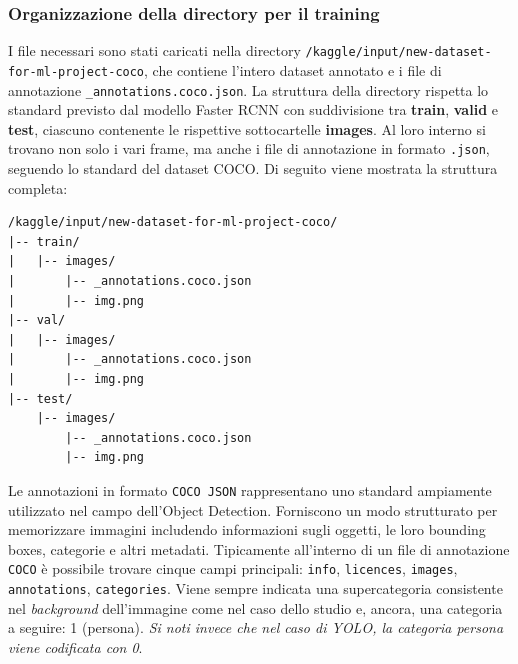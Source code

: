 \documentclass[12pt]{article}
\begin{document}
\subsubsection{Organizzazione della directory per il training}
I file necessari sono stati caricati nella directory \texttt{/kaggle/input/new-dataset-}\\
\texttt{for-ml-project-coco}, che contiene l'intero dataset annotato e i file di annotazione \texttt{\_annotations.coco.json}. La struttura della directory rispetta lo standard previsto dal modello Faster RCNN con suddivisione tra \textbf{train},\textbf{ valid }e \textbf{test}, ciascuno contenente le rispettive sottocartelle \textbf{images}. Al loro interno si trovano non solo i vari frame, ma anche i file di annotazione in formato \texttt{.json}, seguendo lo standard del dataset COCO. Di seguito viene mostrata la struttura completa:

\begin{verbatim}
/kaggle/input/new-dataset-for-ml-project-coco/
|-- train/
|   |-- images/
|       |-- _annotations.coco.json
|       |-- img.png
|-- val/
|   |-- images/
|       |-- _annotations.coco.json
|       |-- img.png
|-- test/
    |-- images/
        |-- _annotations.coco.json
        |-- img.png
\end{verbatim}
Le annotazioni in formato \texttt{COCO JSON} rappresentano uno standard ampiamente utilizzato nel campo dell'Object Detection. Forniscono un modo strutturato per memorizzare immagini includendo informazioni sugli oggetti, le loro bounding boxes, categorie e altri metadati. Tipicamente all'interno di un file di annotazione \texttt{COCO} è possibile trovare cinque campi principali: \texttt{info}, \texttt{licences}, \texttt{images}, \texttt{annotations}, \texttt{categories}. Viene sempre indicata una supercategoria consistente nel \textit{background} dell'immagine come nel caso dello studio e, ancora, una categoria a seguire: 1 (persona). \textit{Si noti invece che nel caso di YOLO, la categoria persona viene codificata con 0}.
\end{document}
